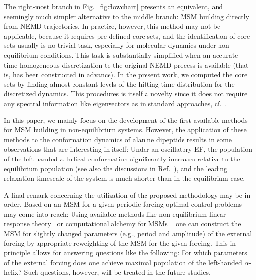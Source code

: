 \documentclass[journal=jctcce,manuscript=article]{achemso}
\begin{document}
The right-most branch in Fig.~\ref{fig:flowchart} presents an
equivalent, and seemingly
much simpler alternative to the middle branch: MSM building directly from NEMD trajectories.
In practice, however, this method may not be applicable, because
it requires pre-defined core sets, and the identification of core sets 
usually is no trivial task, especially for molecular dynamics under non-equilibrium conditions.
This task is substantially simplified when an accurate time-homogeneous discretization 
to the original NEMD process is available (that is, has been constructed in advance).
In the present work, we computed the core sets by
finding almost constant levels of the hitting time distribution for the discretized dynamics. 
This procedures is itself a novelty since it does not require any spectral information like eigenvectors as in standard approaches, cf.~\cite{prinz2011markov,A19-1}.


In this paper, we mainly focus on the development of the first available methods for MSM
building in non-equilibrium systems.
However, the application of these methods to the conformation dynamics of alanine dipeptide results in some observations that are interesting in itself: Under an
oscillatory EF, the population of the left-handed $\alpha$-helical conformation
significantly increases relative to the equilibrium population
(see also the discussions in Ref.~\cite{wang2014exploring}),
and the leading relaxation timescale of the system is much shorter than in the equilibrium case.

A final remark concerning the utilization of the proposed methodology may be in order. 
Based on an MSM for a given periodic forcing optimal control problems may come into reach:
Using available methods like non-equilibrium
linear response theory~\cite{wang2013linear} or computational alchemy for MSMs ~\cite{schutte2014markov} one can construct the MSM for slightly changed parameters (e.g., period and amplitude) of the external forcing by appropriate reweighting of the MSM for the given forcing. This in principle allows for  answering questions like the following:
For which parameters of the external forcing does one achieve maximal population of  the left-handed $\alpha$-helix?
Such questions, however, will
be treated in the future studies.


  
\end{document}
